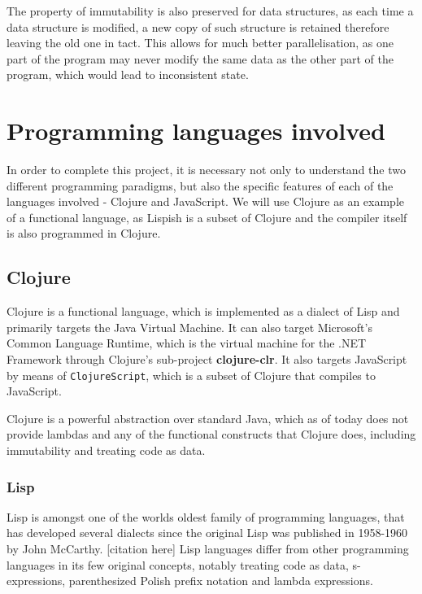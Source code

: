 The property of immutability is also preserved for data structures, as each time a data structure is modified, a new copy of such structure is retained therefore leaving the old one in tact. This allows for much better parallelisation, as one part of the program may never modify the same data as the other part of the program, which would lead to inconsistent state.

\section{Programming languages involved}
In order to complete this project, it is necessary not only to understand the two different programming paradigms, but also the specific features of each of the languages involved - Clojure and JavaScript.
We will use Clojure as an example of a functional language, as Lispish is a subset of Clojure and the compiler itself is also programmed in Clojure.

\subsection{Clojure}
Clojure\cite{Clojure:2013:Site} is a functional language, which is implemented as a dialect of Lisp and primarily targets the Java Virtual Machine. It can also target Microsoft's Common Language Runtime, which is the virtual machine for the .NET Framework through Clojure's sub-project \textbf{clojure-clr}\cite{clojure-clr}. 
It also targets JavaScript by means of \texttt{ClojureScript}\cite{ClojureScript:2013:Site}, which is a subset of Clojure that compiles to JavaScript. 

Clojure is a powerful abstraction over standard Java, which as of today does not provide lambdas and any of the functional constructs that Clojure does, including immutability and treating code as data.

\subsubsection{Lisp}

Lisp is amongst one of the worlds oldest family of programming languages, that has developed several dialects since the original Lisp was published in 1958-1960 by John McCarthy. [citation here]
Lisp languages differ from other programming languages in its few original concepts, notably treating code as data, s-expressions, parenthesized Polish prefix notation and lambda expressions.

